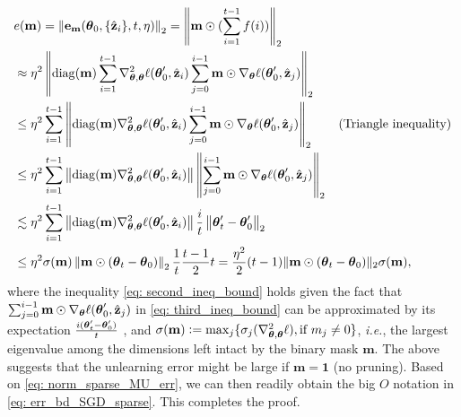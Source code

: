   \begin{align}
  &  e(\mathbf m) =   \left\|  \mathbf e_{\mathbf m}(\boldsymbol{\theta}_0, \{ \hat{\mathbf z}_i \},  t, \eta) \right\|_2 = \left\| \mathbf m \odot (\sum_{i=1}^{t-1} f(i)) \right\|_2 \nonumber \\
     & \approx \eta^2 \left\| \mathrm{diag}(\mathbf m)   \sum_{i=1}^{t-1} \nabla^2_{\boldsymbol{\theta}, \boldsymbol{\theta}} \ell (\boldsymbol{\theta}_0^\prime, \hat{\mathbf z}_i) \sum_{j=0}^{i-1} \mathbf m \odot \nabla_{\boldsymbol{\theta}} \ell (\boldsymbol{\theta}_0^\prime, \hat{\mathbf z}_j) \right\|_2 \nonumber \\ 
     &\leq \eta^2 \sum_{i=1}^{t-1} \left\| \mathrm{diag}(\mathbf m)  \nabla^2_{\boldsymbol{\theta}, \boldsymbol{\theta}} \ell (\boldsymbol{\theta}_0^\prime, \hat{\mathbf z}_i) \sum_{j=0}^{i-1} \mathbf m \odot \nabla_{\boldsymbol{\theta}} \ell (\boldsymbol{\theta}_0^\prime, \hat{\mathbf z}_j) \right\|_2 \tag{Triangle inequality} \\
     & \leq \eta^2 \sum_{i=1}^{t-1} \left\| \mathrm{diag}(\mathbf m) 
    \nabla^2_{\boldsymbol{\theta}, \boldsymbol{\theta}} \ell (\boldsymbol{\theta}_0^\prime, \hat{\mathbf z}_i) \right\| \left\| \sum_{j=0}^{i-1} \mathbf m \odot \nabla_{\boldsymbol{\theta}} \ell (\boldsymbol{\theta}_0^\prime, \hat{\mathbf z}_j) \right\|_2 \label{eq: third_ineq_bound} \\ 
    &\lesssim \eta^2 \sum_{i=1}^{t-1} \left\| \mathrm{diag}(\mathbf m)  \nabla^2_{\boldsymbol{\theta}, \boldsymbol{\theta}} \ell (\boldsymbol{\theta}_0^\prime, \hat{\mathbf z}_i) \right\| \frac{i}{t } \left\|\boldsymbol{\theta}_t^\prime - \boldsymbol{\theta}_0^\prime \right\|_2  \label{eq: second_ineq_bound} \\
     & \leq \eta^2  \sigma (\mathbf m)   
     \left\| \mathbf m \odot (\boldsymbol{\theta}_t - \boldsymbol{\theta}_0 )\right\|_2  \frac{1}{t } \frac{t-1}{2} t = \frac{\eta^2}{2}{(t-1) \| 
   \mathbf m \odot (\boldsymbol{\theta}_t - \boldsymbol{\theta}_0) \|_2}  \sigma(\mathbf m),
   \label{eq: norm_sparse_MU_err}
 \end{align}
where the   inequality \eqref{eq: second_ineq_bound} holds given the fact that  
$\sum_{j=0}^{i-1} \mathbf m \odot \nabla_{\boldsymbol{\theta}} \ell (\boldsymbol{\theta}_0^\prime, \hat{\mathbf z}_j)$ in \eqref{eq: third_ineq_bound} can be approximated by its expectation $\frac{i (\boldsymbol{\theta}_t^\prime - \boldsymbol{\theta}_0^\prime)}{t}$  \cite[Eq.\,7]{thudi2021unrolling}, and
$\sigma(\mathbf m) \mathrel{\mathop:}= \max_{j} \{  \sigma_{j}( \nabla_{\boldsymbol{\theta},\boldsymbol{\theta}}^2\ell ), \text{if } m_j \neq 0  \}$, \textit{i.e.}, the largest eigenvalue among the dimensions left intact by the binary mask $\mathbf m$. 
The above suggests that the unlearning error might be large if $\mathbf m = \mathbf 1$ (no pruning). 
Based on \eqref{eq: norm_sparse_MU_err}, we can then readily obtain the big $O$ notation in \eqref{eq: err_bd_SGD_sparse}.
This completes the proof.

